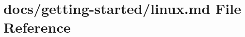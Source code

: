 \hypertarget{linux_8md}{}\section{docs/getting-\/started/linux.md File Reference}
\label{linux_8md}
